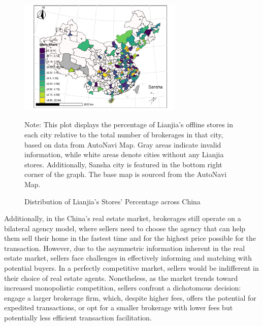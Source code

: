 \documentclass[11pt]{article}
\begin{document}
\begin{figure}[H]
  \centering
  \includegraphics[width=0.7\textwidth]{../figures/distribution_of_cities_share.pdf}
  \caption{Distribution of Lianjia's Stores' Percentage across China}
  \label{fig:precise_proportion_contraction}
  Note: This plot displays the percentage of Lianjia's offline stores in each city relative to the total number of brokerages in that city, based on data from AutoNavi Map. Gray areas indicate invalid information, while white areas denote cities without any Lianjia stores. Additionally, Sansha city is featured in the bottom right corner of the graph. The base map is sourced from the AutoNavi Map.
\end{figure}

Additionally, in the China's real estate market, brokerages still operate on a bilateral agency model, where sellers need to choose the agency that can help them sell their home in the fastest time and for the highest price possible for the transaction. However, due to the asymmetric information inherent in the real estate market, sellers face challenges in effectively informing and matching with potential buyers. In a perfectly competitive market, sellers would be indifferent in their choice of real estate agents. Nonetheless, as the market trends toward increased monopolistic competition, sellers confront a dichotomous decision: engage a larger brokerage firm, which, despite higher fees, offers the potential for expedited transactions, or opt for a smaller brokerage with lower fees but potentially less efficient transaction facilitation.
\end{document}
